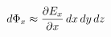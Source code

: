 \documentclass[preview]{standalone}
\begin{document}
\begin{align*}
\special{dvisvgm:raw <g id='unique000'>}d\Phi_x\approx\frac{\partial E_x}{\partial x}\,dx\,dy\,dz\special{dvisvgm:raw </g>}
\end{align*}
\end{document}
